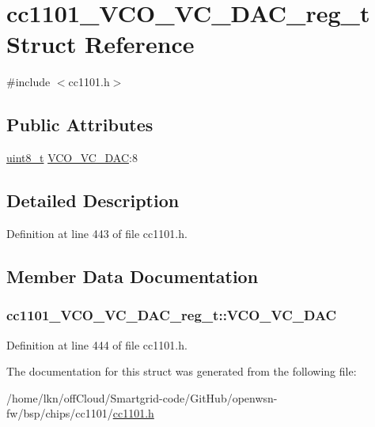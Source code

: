\hypertarget{structcc1101___v_c_o___v_c___d_a_c__reg__t}{}\section{cc1101\+\_\+\+V\+C\+O\+\_\+\+V\+C\+\_\+\+D\+A\+C\+\_\+reg\+\_\+t Struct Reference}
\label{structcc1101___v_c_o___v_c___d_a_c__reg__t}


{\ttfamily \#include $<$cc1101.\+h$>$}

\subsection*{Public Attributes}
\begin{DoxyCompactItemize}
\item 
\hyperlink{_p_e___types_8h_aba7bc1797add20fe3efdf37ced1182c5}{uint8\+\_\+t} \hyperlink{structcc1101___v_c_o___v_c___d_a_c__reg__t_acdf87a2259a766ffbd58ef431545d22a}{V\+C\+O\+\_\+\+V\+C\+\_\+\+D\+AC}\+:8
\end{DoxyCompactItemize}


\subsection{Detailed Description}


Definition at line 443 of file cc1101.\+h.



\subsection{Member Data Documentation}
\subsubsection[{\texorpdfstring{V\+C\+O\+\_\+\+V\+C\+\_\+\+D\+AC}{VCO_VC_DAC}}]{ cc1101\+\_\+\+V\+C\+O\+\_\+\+V\+C\+\_\+\+D\+A\+C\+\_\+reg\+\_\+t\+::\+V\+C\+O\+\_\+\+V\+C\+\_\+\+D\+AC}\hypertarget{structcc1101___v_c_o___v_c___d_a_c__reg__t_acdf87a2259a766ffbd58ef431545d22a}{}\label{structcc1101___v_c_o___v_c___d_a_c__reg__t_acdf87a2259a766ffbd58ef431545d22a}


Definition at line 444 of file cc1101.\+h.



The documentation for this struct was generated from the following file\+:\begin{DoxyCompactItemize}
\item 
/home/lkn/off\+Cloud/\+Smartgrid-\/code/\+Git\+Hub/openwsn-\/fw/bsp/chips/cc1101/\hyperlink{cc1101_8h}{cc1101.\+h}\end{DoxyCompactItemize}
